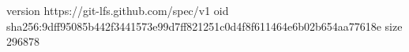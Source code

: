 version https://git-lfs.github.com/spec/v1
oid sha256:9dff95085b442f3441573e99d7ff821251c0d4f8f611464e6b02b654aa77618e
size 296878
